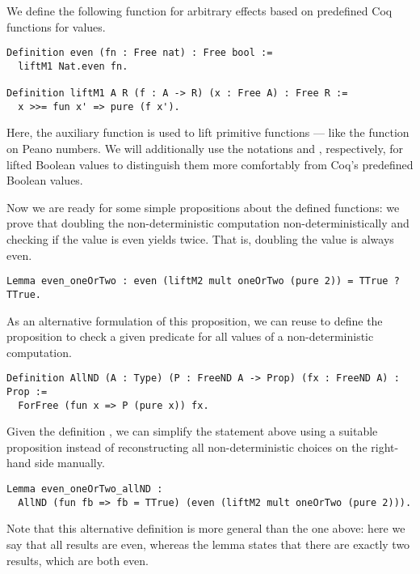 We define the following function  for arbitrary effects based on predefined Coq functions for  values.

\begin{verbatim}
Definition even (fn : Free nat) : Free bool :=
  liftM1 Nat.even fn.

Definition liftM1 A R (f : A -> R) (x : Free A) : Free R :=
  x >>= fun x' => pure (f x').
\end{verbatim}

Here, the auxiliary function  is used to lift primitive functions --- like the  function on Peano numbers.
We will additionally use the notations  and , respectively, for lifted Boolean values to distinguish them more comfortably from Coq's predefined Boolean values.

Now we are ready for some simple propositions about the defined functions: we prove that doubling the non\--deterministic computation  non\--deterministically and checking if the value is even yields  twice.
That is, doubling the value  is always even.

\begin{verbatim}
Lemma even_oneOrTwo : even (liftM2 mult oneOrTwo (pure 2)) = TTrue ? TTrue.
\end{verbatim}

As an alternative formulation of this proposition, we can reuse  to define the proposition  to check a given predicate for all values of a non\--deterministic computation.

\begin{verbatim}
Definition AllND (A : Type) (P : FreeND A -> Prop) (fx : FreeND A) : Prop :=
  ForFree (fun x => P (pure x)) fx.
\end{verbatim}

Given the definition , we can simplify the statement above using a suitable proposition instead of reconstructing all non\--deterministic choices on the right\--hand side manually.

\begin{verbatim}
Lemma even_oneOrTwo_allND :
  AllND (fun fb => fb = TTrue) (even (liftM2 mult oneOrTwo (pure 2))).
\end{verbatim}

Note that this alternative definition is more general than the one above: here we say that all results are even, whereas the lemma  states that there are exactly two results, which are both even.


